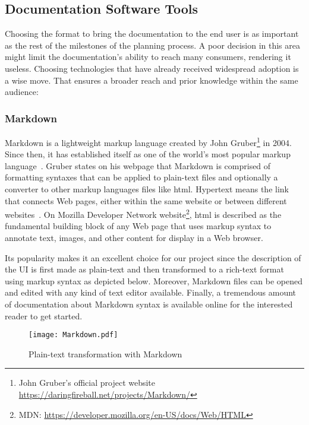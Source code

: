 \subsection{Documentation Software Tools}

Choosing the format to bring the documentation to the end user is as important as the rest of the milestones of the planning process. A poor decision in this area might limit the documentation's ability to reach many consumers, rendering it useless. Choosing technologies that have already received widespread adoption is a wise move. That ensures a broader reach and prior knowledge within the same audience:

\subsubsection{Markdown}\label{sec:MD}

Markdown is a lightweight markup language created by John Gruber\footnote{John Gruber's official project website \url{https://daringfireball.net/projects/Markdown/}} in 2004. Since then, it has established itself as one of the world's most popular markup language~\cite{Markdown}. Gruber states on his webpage that Markdown is comprised of formatting syntaxes that can be applied to plain-text files and optionally a converter to other markup languages files like \gls{html}. Hypertext means the link that connects Web pages, either within the same website or between different websites~\cite{mozillaMDN}. On Mozilla Developer Network website\footnote{MDN: \url{https://developer.mozilla.org/en-US/docs/Web/HTML}}, \gls*{html} is described as the fundamental building block of any Web page that uses markup syntax to annotate text, images, and other content for display in a Web browser.

Its popularity makes it an excellent choice for our project since the description of the UI is first made as plain-text and then transformed to a rich-text format using markup syntax as depicted below. Moreover, Markdown files can be opened and edited with any kind of text editor available. Finally, a tremendous amount of documentation about Markdown syntax is available online for the interested reader to get started.

\begin{figure}[h]
    \centering
    \texttt{[image: Markdown.pdf]}
    \caption{Plain-text transformation with Markdown}
    \label{fig:Markdown}
\end{figure}

